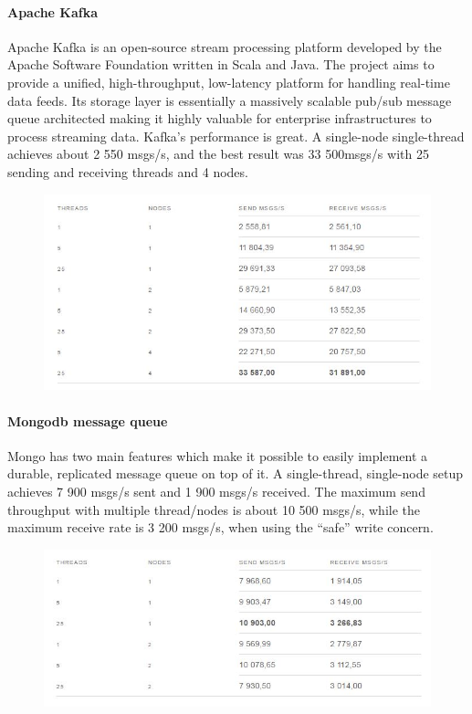 \paragraph{Apache Kafka}
\label{sec:sec01}
Apache Kafka is an open-source stream processing platform developed by the Apache Software Foundation 
written in Scala and Java. The project aims to provide a unified, high-throughput, low-latency platform for handling 
real-time data feeds. Its storage layer is essentially a massively scalable pub/sub message queue 
architected making it highly valuable for enterprise infrastructures to process streaming data.
Kafka's performance is great. A single-node single-thread achieves about 2 550 msgs/s, and the best result
 was 33 500msgs/s with 25 sending and receiving threads and 4 nodes.
\begin{figure}[h!]
	\centering
	\includegraphics[height=0.3\textheight]{fig01/kafkaPerformance}
	\label{fig:FilialesEtClients}
\end{figure}

\paragraph{Mongodb message queue}
\label{sec:sec01}
Mongo has two main features which make it possible to easily implement a durable, replicated message queue on top of it.
A single-thread, single-node setup achieves 7 900 msgs/s sent and 1 900 msgs/s received. 
The maximum send throughput with multiple thread/nodes is about 10 500 msgs/s,
 while the maximum receive rate is 3 200 msgs/s, when using the “safe” write concern.
 \begin{figure}[h!]
	\centering
	\includegraphics[height=0.2\textheight]{fig01/MongodbMessageQ}
	\label{fig:FilialesEtClients}
\end{figure}


